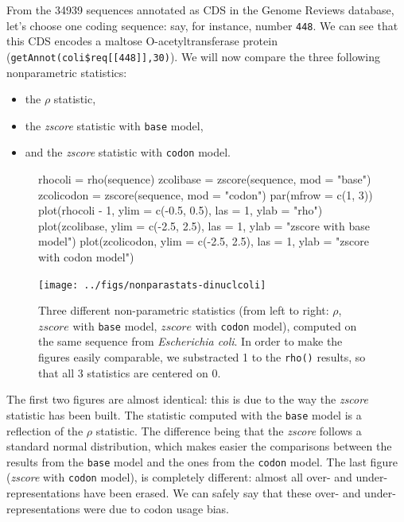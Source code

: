 \documentclass{article}
\begin{document}
From the 34939 sequences
annotated as CDS in the Genome Reviews database, let's choose one
coding sequence: say, for instance, number \texttt{448}. We can see
that this CDS encodes a maltose O-acetyltransferase protein
(\verb+getAnnot(coli$req[[448]],30)+). We will now compare the three
following nonparametric statistics:

\begin{itemize}
\item the $\rho$ statistic,
\item the \textit{zscore} statistic with \texttt{base} model,
\item and the \textit{zscore} statistic with \texttt{codon} model.
\end{itemize}

\begin{figure}[H]
  \begin{center}
\begin{Schunk}
\begin{Sinput}
 rhocoli = rho(sequence)
 zcolibase = zscore(sequence, mod = "base")
 zcolicodon = zscore(sequence, mod = "codon")
 par(mfrow = c(1, 3))
 plot(rhocoli - 1, ylim = c(-0.5, 0.5), las = 1, ylab = "rho")
 plot(zcolibase, ylim = c(-2.5, 2.5), las = 1, ylab = "zscore with base model")
 plot(zcolicodon, ylim = c(-2.5, 2.5), las = 1, ylab = "zscore with codon model")
\end{Sinput}
\end{Schunk}
\texttt{[image: ../figs/nonparastats-dinuclcoli]}
\end{center}
   \caption{Three different non-parametric statistics (from left to
   right: $\rho$, $zscore$ with \texttt{base} model, $zscore$ with
   \texttt{codon} model), computed on the same sequence from
   \textit{Escherichia coli}. In order to make the figures easily
   comparable, we substracted 1 to the \texttt{rho()} results, so that
   all 3 statistics are centered on 0. }
\label{dinuclcoli}
\end{figure}

The first two figures are almost identical: this is due to the way the
\textit{zscore} statistic has been built. The statistic computed with
the \texttt{base} model is a reflection of the $\rho$ statistic. The
difference being that the \textit{zscore} follows a standard normal
distribution, which makes easier the comparisons between the results
from the \texttt{base} model and the ones from the \texttt{codon}
model. The last figure (\textit{zscore} with \texttt{codon} model), is
completely different: almost all over- and under-representations have
been erased. We can safely say that these over- and
under-representations were due to codon usage bias.
\end{document}
